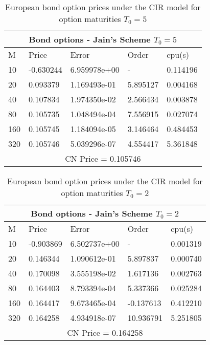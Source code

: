 \documentclass[11pt]{article}
\begin{document}
\begin{table}[htp]
\begin{tabular}{ |p{2cm}|p{3cm}|p{3cm}|p{3cm}|p{3cm}|  }
 \hline
 \multicolumn{5}{|c|}{Bond options - Jain’s Scheme   $T_0 = 5$   } \\
 \hline
 M & Price & Error & Order & cpu(s)\\
 \hline
10 & -0.630244 & 6.959978e+00 &  - & 0.114196\\
20 & 0.093379 & 1.169493e-01 & 5.895127 & 0.004168\\
40 & 0.107834 & 1.974350e-02 & 2.566434 & 0.003878\\
80 & 0.105735 & 1.048494e-04 & 7.556915 & 0.027074\\
160 & 0.105745 & 1.184094e-05 & 3.146464 & 0.484453\\
320 & 0.105746 & 5.039296e-07 & 4.554417 & 5.361848\\
 \hline
 \multicolumn{5}{|c|}{CN Price = 0.105746} \\
 \hline
 
\end{tabular}
\caption{ European bond option prices under the CIR model for option maturities $T_0 = 5$}

\end{table}


\begin{table}[htp]
\begin{tabular}{ |p{2cm}|p{3cm}|p{3cm}|p{3cm}|p{3cm}|  }
 \hline
 \multicolumn{5}{|c|}{Bond options - Jain’s Scheme   $T_0 = 2$   } \\
 \hline
 M & Price & Error & Order & cpu(s)\\
 \hline
10 & -0.903869 & 6.502737e+00 &  - & 0.001319\\
20 & 0.146344 & 1.090612e-01 & 5.897837 & 0.000740\\
40 & 0.170098 & 3.555198e-02 & 1.617136 & 0.002763\\
80 & 0.164403 & 8.793394e-04 & 5.337366 & 0.025284\\
160 & 0.164417 & 9.673465e-04 & -0.137613 & 0.412210\\
320 & 0.164258 & 4.934918e-07 & 10.936791 & 5.251805\\
 \hline
 \multicolumn{5}{|c|}{CN Price = 0.164258} \\
 \hline
 
\end{tabular}
\caption{ European bond option prices under the CIR model for option maturities $T_0 = 2$ }

\end{table}
\end{document}
